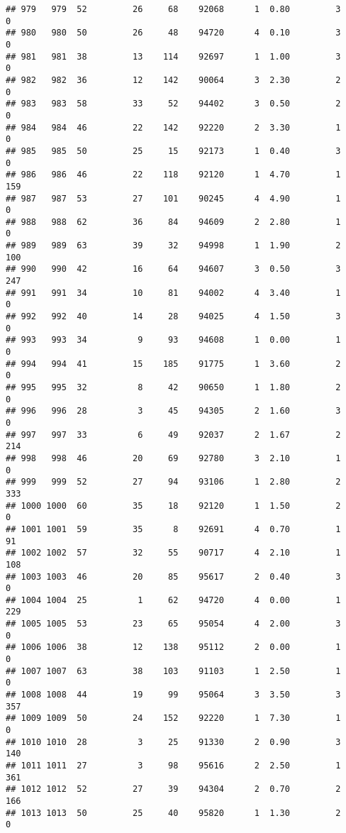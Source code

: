 \documentclass[
]{article}
\begin{document}
\begin{verbatim}
## 979   979  52         26     68    92068      1  0.80         3        0
## 980   980  50         26     48    94720      4  0.10         3        0
## 981   981  38         13    114    92697      1  1.00         3        0
## 982   982  36         12    142    90064      3  2.30         2        0
## 983   983  58         33     52    94402      3  0.50         2        0
## 984   984  46         22    142    92220      2  3.30         1        0
## 985   985  50         25     15    92173      1  0.40         3        0
## 986   986  46         22    118    92120      1  4.70         1      159
## 987   987  53         27    101    90245      4  4.90         1        0
## 988   988  62         36     84    94609      2  2.80         1        0
## 989   989  63         39     32    94998      1  1.90         2      100
## 990   990  42         16     64    94607      3  0.50         3      247
## 991   991  34         10     81    94002      4  3.40         1        0
## 992   992  40         14     28    94025      4  1.50         3        0
## 993   993  34          9     93    94608      1  0.00         1        0
## 994   994  41         15    185    91775      1  3.60         2        0
## 995   995  32          8     42    90650      1  1.80         2        0
## 996   996  28          3     45    94305      2  1.60         3        0
## 997   997  33          6     49    92037      2  1.67         2      214
## 998   998  46         20     69    92780      3  2.10         1        0
## 999   999  52         27     94    93106      1  2.80         2      333
## 1000 1000  60         35     18    92120      1  1.50         2        0
## 1001 1001  59         35      8    92691      4  0.70         1       91
## 1002 1002  57         32     55    90717      4  2.10         1      108
## 1003 1003  46         20     85    95617      2  0.40         3        0
## 1004 1004  25          1     62    94720      4  0.00         1      229
## 1005 1005  53         23     65    95054      4  2.00         3        0
## 1006 1006  38         12    138    95112      2  0.00         1        0
## 1007 1007  63         38    103    91103      1  2.50         1        0
## 1008 1008  44         19     99    95064      3  3.50         3      357
## 1009 1009  50         24    152    92220      1  7.30         1        0
## 1010 1010  28          3     25    91330      2  0.90         3      140
## 1011 1011  27          3     98    95616      2  2.50         1      361
## 1012 1012  52         27     39    94304      2  0.70         2      166
## 1013 1013  50         25     40    95820      1  1.30         2        0

\end{verbatim}
\end{document}
